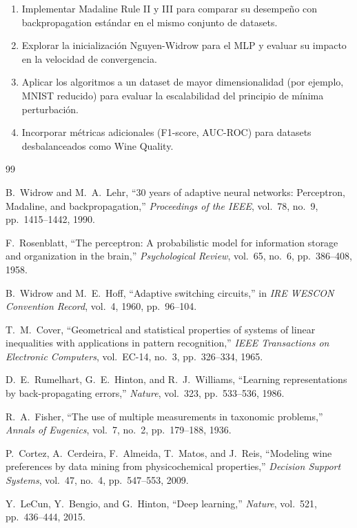 \documentclass[12pt,a4paper]{article}
\begin{document}
\begin{enumerate}[leftmargin=*]
    \item Implementar Madaline Rule II y III para comparar su desempeño con backpropagation estándar en el mismo conjunto de datasets.
    \item Explorar la inicialización Nguyen-Widrow para el MLP y evaluar su impacto en la velocidad de convergencia.
    \item Aplicar los algoritmos a un dataset de mayor dimensionalidad (por ejemplo, MNIST reducido) para evaluar la escalabilidad del principio de mínima perturbación.
    \item Incorporar métricas adicionales (F1-score, AUC-ROC) para datasets desbalanceados como Wine Quality.
\end{enumerate}

\begin{thebibliography}{99}

B.~Widrow and M.~A.~Lehr, ``30 years of adaptive neural networks: Perceptron, Madaline, and backpropagation,''
\textit{Proceedings of the IEEE}, vol.~78, no.~9, pp.~1415--1442, 1990.

F.~Rosenblatt, ``The perceptron: A probabilistic model for information storage and organization in the brain,''
\textit{Psychological Review}, vol.~65, no.~6, pp.~386--408, 1958.

B.~Widrow and M.~E.~Hoff, ``Adaptive switching circuits,''
in \textit{IRE WESCON Convention Record}, vol.~4, 1960, pp.~96--104.

T.~M.~Cover, ``Geometrical and statistical properties of systems of linear inequalities with applications in pattern recognition,''
\textit{IEEE Transactions on Electronic Computers}, vol.~EC-14, no.~3, pp.~326--334, 1965.

D.~E.~Rumelhart, G.~E.~Hinton, and R.~J.~Williams, ``Learning representations by back-propagating errors,''
\textit{Nature}, vol.~323, pp.~533--536, 1986.

R.~A.~Fisher, ``The use of multiple measurements in taxonomic problems,''
\textit{Annals of Eugenics}, vol.~7, no.~2, pp.~179--188, 1936.

P.~Cortez, A.~Cerdeira, F.~Almeida, T.~Matos, and J.~Reis, ``Modeling wine preferences by data mining from physicochemical properties,''
\textit{Decision Support Systems}, vol.~47, no.~4, pp.~547--553, 2009.

Y.~LeCun, Y.~Bengio, and G.~Hinton, ``Deep learning,''
\textit{Nature}, vol.~521, pp.~436--444, 2015.

\end{thebibliography}
\end{document}
